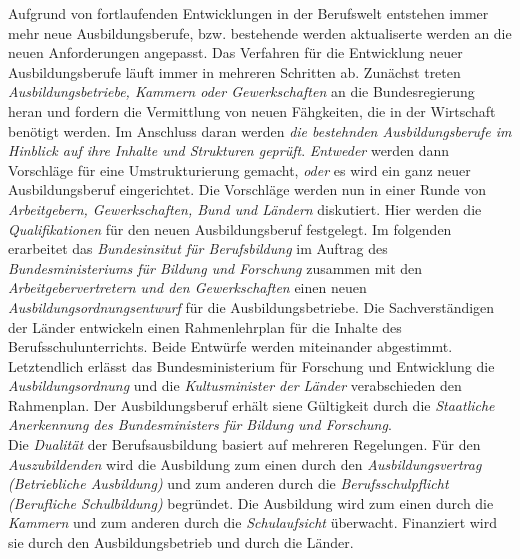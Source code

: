 \documentclass[a4paper, 12pt]{report}
\begin{document}
Aufgrund von fortlaufenden Entwicklungen in der Berufswelt entstehen immer mehr 
neue Ausbildungsberufe, bzw. bestehende werden aktualiserte werden an die neuen 
Anforderungen angepasst. Das Verfahren für die Entwicklung neuer 
Ausbildungsberufe läuft immer in mehreren Schritten ab. Zunächst treten \emph{
Ausbildungsbetriebe, Kammern oder Gewerkschaften} an die Bundesregierung heran 
und fordern die Vermittlung von neuen Fähgkeiten, die in der Wirtschaft benötigt 
werden. Im Anschluss daran werden \emph{die bestehnden Ausbildungsberufe im 
Hinblick auf ihre Inhalte und Strukturen geprüft}. \emph{Entweder} werden dann 
Vorschläge für eine Umstrukturierung gemacht, \emph{oder} es wird ein ganz neuer 
Ausbildungsberuf eingerichtet. Die Vorschläge werden nun in einer Runde von 
\emph{Arbeitgebern, Gewerkschaften, Bund und Ländern} diskutiert. Hier werden 
die \emph{Qualifikationen} für den neuen Ausbildungsberuf festgelegt. Im 
folgenden erarbeitet das \emph{Bundesinsitut für Berufsbildung} im Auftrag des 
\emph{Bundesministeriums für Bildung und Forschung} zusammen mit den 
\emph{Arbeitgebervertretern und den Gewerkschaften} einen neuen 
\emph{Ausbildungsordnungsentwurf} für die Ausbildungsbetriebe. Die 
Sachverständigen der Länder entwickeln einen Rahmenlehrplan für die Inhalte des 
Berufsschulunterrichts. Beide Entwürfe werden miteinander abgestimmt. 
Letztendlich erlässt das Bundesministerium für Forschung und Entwicklung die 
\emph{Ausbildungsordnung} und die \emph{Kultusminister der Länder} verabschieden 
den Rahmenplan. Der Ausbildungsberuf erhält siene Gültigkeit durch die 
\emph{Staatliche Anerkennung des Bundesministers für Bildung und Forschung}. \\

Die \emph{Dualität} der Berufsausbildung basiert auf mehreren Regelungen. Für 
den \emph{Auszubildenden} wird die Ausbildung zum einen durch den 
\emph{Ausbildungsvertrag (Betriebliche Ausbildung)} und zum anderen durch die 
\emph{Berufsschulpflicht (Berufliche Schulbildung)} begründet. Die Ausbildung
wird zum einen durch die \emph{Kammern} und zum anderen durch die 
\emph{Schulaufsicht} überwacht. Finanziert wird sie durch den Ausbildungsbetrieb
und durch die Länder. 



\end{document}
